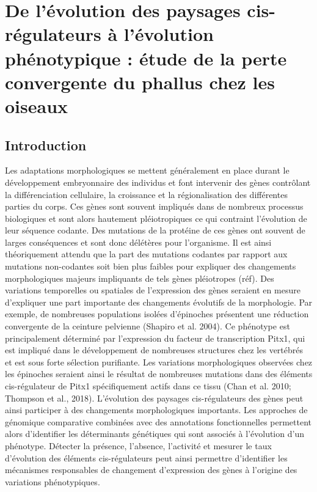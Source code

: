 \chapter{De l’évolution des paysages cis-régulateurs à l’évolution phénotypique : étude de la perte convergente du phallus chez les oiseaux}
{\hypersetup{linkcolor=GREYDARK}\minitoc}
\label{chap:4-evolpheno}

\section{Introduction}

Les adaptations morphologiques se mettent généralement en place durant le développement embryonnaire des individus et font intervenir des gènes contrôlant la différenciation cellulaire, la croissance et la régionalisation des différentes parties du corps. Ces gènes sont souvent impliqués dans de nombreux processus biologiques et sont alors hautement pléiotropiques ce qui contraint l’évolution de leur séquence codante. Des mutations de la protéine de ces gènes ont souvent de larges conséquences et sont donc délétères pour l’organisme. Il est ainsi théoriquement attendu que la part des mutations codantes par rapport aux mutations non-codantes soit bien plus faibles pour expliquer des changements morphologiques majeurs impliquants de tels gènes pléiotropes (réf). Des variations temporelles ou spatiales de l’expression des gènes seraient en mesure d’expliquer une part importante des changements évolutifs de la morphologie. Par exemple, de nombreuses populations isolées d’épinoches présentent une réduction convergente de la ceinture pelvienne (Shapiro et al. 2004). Ce phénotype est principalement déterminé par l’expression du facteur de transcription Pitx1, qui est impliqué dans le développement de nombreuses structures chez les vertébrés et est sous forte sélection purifiante. Les variations morphologiques observées chez les épinoches seraient ainsi le résultat de nombreuses mutations dans des éléments cis-régulateur de Pitx1 spécifiquement actifs dans ce tissu (Chan et al. 2010; Thompson et al., 2018). L’évolution des paysages cis-régulateurs des gènes peut ainsi participer à des changements morphologiques importants. Les approches de génomique comparative combinées avec des annotations fonctionnelles permettent alors d’identifier les déterminants génétiques qui sont associés à l’évolution d’un phénotype. Détecter la présence, l’absence, l’activité et mesurer le taux d’évolution des éléments cis-régulateurs peut ainsi permettre d’identifier les mécanismes responsables de changement d’expression des gènes à l’origine des variations phénotypiques. \\

